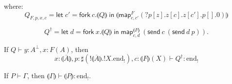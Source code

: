 \documentclass[orivec,envcountsame]{llncs}
\newcommand{\cpdual}[1]{#1^\perp}
\newcommand{\gvdual}[1]{\overline{#1}}
\newcommand{\gvout}[2]{{!#1.#2}}
\newcommand{\outterm}{\mathrm{end}_!}
\newcommand{\gvservice}[1]{\sharp #1}
\newcommand{\cptyp}[2]{#1 \vdash #2}
\newcommand{\gvtyp}[3]{#1 \vdash #2 : #3}
\newcommand{\mapname}{\mathsf{map}}
\newcommand{\map}[3]{\mapname^{#1}_{#2}(#3)}
\newcommand{\gvmap}[3]{\mapname^{#1}_{#2}\:#3}
\newcommand{\mkwd}[1]{\mathsf{#1}}
\newcommand{\derelict}[2]{{?#1[#2]}}
\newcommand{\gvsend}[2]{\mkwd{send}\:#1\:#2}
\newcommand{\gvlet}[3]{\mkwd{let}\;#1 = #2\;\mkwd{in}\;#3}
\newcommand{\gvfork}[2]{\mkwd{fork}\:#1.#2}
\newcommand{\lrkwd}{\mkwd{cofix}}
\newcommand{\gvfix}[3]{\lrkwd\:#1\:#2 = #3}
\newcommand{\gvrequest}[1]{\mkwd{request}\:#1}
\newcommand{\key}{\mkwd}
\newcommand{\togv}[1]{\llparenthesis #1 \rrparenthesis}
\newcommand{\mucp}{$\mu\mathrm{CP}$\xspace}
\newcommand{\mugv}{$\mu\mathrm{GV}$\xspace}
\begin{document}
where:
%
\[
  Q_{F,p,x,c} =
    \gvlet{c'}{\gvfork{c}{\togv{Q}}}
          {\togv{\map{F}{c,c'}{\derelict{p}{z}.z[c].z[c'].p[].0}}}
\]%



%
\[
  Q^\dagger = \gvlet{d}{\gvfork{x}{\togv{Q}}}{\gvmap{\togv{F}}{c,d}{(\gvsend{c}{(\gvsend{d}{p})})}}.
\]



\begin{lemma}
  If $\cptyp{Q}{y:\cpdual{A},x:F(A)}$, then
  \[
    \gvtyp{x:\gvdual{\togv{A}},p:\gvservice{(\gvout{\gvdual{\togv{A}}}{\gvout{X}{\outterm}})},c:\togv{F}(X)}{Q^\dagger}{\outterm}
  \]
\end{lemma}




\begin{theorem}
  If $\cptyp{P}{\Gamma}$, then $\gvtyp{\togv{\Gamma}}{\togv{P}}{\outterm}$.
\end{theorem}
\end{document}
